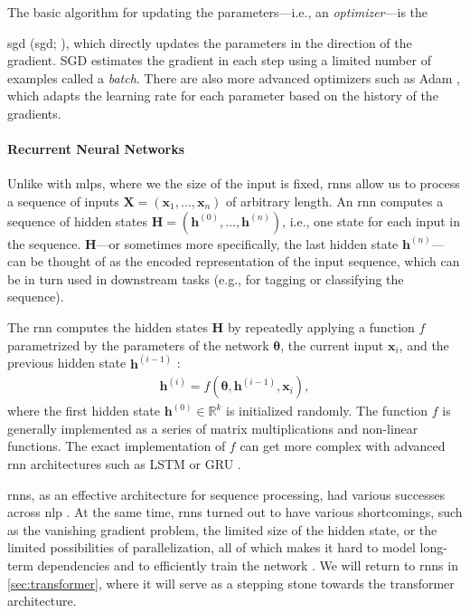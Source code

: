 The basic algorithm for updating the parameters---i.e., an \emph{optimizer}---is the {\acl{sgd} (\acs{sgd}; \citealp[p.~275]{goodfellow2016deep}), which directly updates the parameters in the direction of the gradient. SGD estimates the gradient in each step using a limited number of examples called a \emph{batch}. There are also more advanced optimizers such as Adam \cite{kingma2014adam}, which adapts the learning rate for each parameter based on the history of the gradients.

\paragraph{Recurrent Neural Networks} Unlike with \acp{mlp}, where we the size of the input is fixed, \acp{rnn} allow us to process a sequence of inputs $\mathbf{X} = (\mathbf{x}_1, \ldots, \mathbf{x}_n)$ of arbitrary length. An \ac{rnn} computes a sequence of hidden states $\mathbf{H} = (\mathbf{h}^{(0)}, \ldots, \mathbf{h}^{(n)})$, i.e., one state for each input in the sequence. $\mathbf{H}$---or sometimes more specifically, the last hidden state $\mathbf{h}^{(n)}$---can be thought of as the encoded representation of the input sequence, which can be in turn used in downstream tasks (e.g., for tagging or classifying the sequence).

The \ac{rnn} computes the hidden states $\mathbf{H}$ by repeatedly applying a function $f$ parametrized by the parameters of the network $\boldsymbol{\theta}$, the current input $\mathbf{x}_i$, and the previous hidden state $\mathbf{h}^{(i-1)}$ \cite[p.~367]{goodfellow2016deep}:
\begin{align}
  \mathbf{h}^{(i)} = f(\boldsymbol{\theta}, \mathbf{h}^{(i-1)}, \mathbf{x}_i),
\end{align}
where the first hidden state $\mathbf{h}^{(0)} \in \mathbb{R}^k$ is initialized randomly.  The function $f$ is generally implemented as a series of matrix multiplications and non-linear functions. The exact implementation of $f$ can get more complex with advanced \ac{rnn} architectures such as LSTM \cite{hochreiter1997long} or GRU \cite{cho2014learning}.

\acp{rnn}, as an effective architecture for sequence processing, had various successes across \ac{nlp} \cite{karpathy2015unreasonable,salehinejad2017recent}. At the same time, \acp{rnn} turned out to have various shortcomings, such as the vanishing gradient problem, the limited size of the hidden state, or the limited possibilities of parallelization, all of which makes it hard to model long-term dependencies and to efficiently train the network \cite{hochreiter1998vanishing,pascanu2013difficulty}. We will return to \acp{rnn} in \autoref{sec:transformer}, where it will serve as a stepping stone towards the transformer architecture.


}
